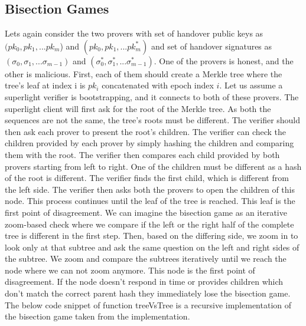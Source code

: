 \documentclass[a4paper,11pt,oneside]{article}
\theoremstyle{definition}
\begin{document}
  \subsection{Bisection Games}
  Lets again consider the two provers with set of handover public keys as  $(pk_0, pk_1, ... pk_m$) and $(pk_0, pk_1, ... pk_m^*)$ and set of handover signatures as $(\sigma_0, \sigma_1, ... \sigma_{m - 1})$ and $(\sigma_0^*, \sigma_1^*, ... \sigma_{m - 1}^*)$. One of the provers is honest, and the other is malicious. First, each of them should create a Merkle tree where the tree's leaf at index i is $pk_i$ concatenated with epoch index $i$. Let us assume a superlight verifier is bootstrapping, and it connects to both of these provers. The superlight client will first ask for the root of the Merkle tree. As both the sequences are not the same, the tree's roots must be different. The verifier should then ask each prover to present the root's children. The verifier can check the children provided by each prover by simply hashing the children and comparing them with the root. The verifier then compares each child provided by both provers starting from left to right. One of the children must be different as a hash of the root is different. The verifier finds the first child, which is different from the left side. The verifier then asks both the provers to open the children of this node. This process continues until the leaf of the tree is reached. This leaf is the first point of disagreement. We can imagine the bisection game as an iterative zoom-based check where we compare if the left or the right half of the complete tree is different in the first step. Then, based on the differing side, we zoom in to look only at that subtree and ask the same question on the left and right sides of the subtree. We zoom and compare the subtrees iteratively until we reach the node where we can not zoom anymore. This node is the first point of disagreement. If the node doesn't respond in time or provides children  which don't match the correct parent hash they immediately lose the bisection game. The below code snippet of function treeVsTree is a recursive implementation of the bisection game taken from the implementation.  
  
\end{document}
